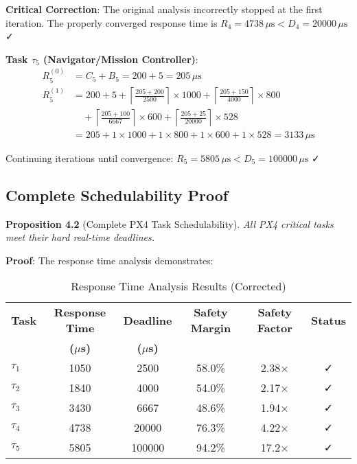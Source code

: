 \documentclass[11pt,a4paper]{article}
\theoremstyle{definition}
\theoremstyle{remark}
\begin{document}
\textbf{Critical Correction}: The original analysis incorrectly stopped at the first iteration. The properly converged response time is $R_4 = 4738\,\mu\text{s} < D_4 = 20000\,\mu\text{s}$ ✓

\textbf{Task $\tau_5$ (Navigator/Mission Controller)}:
\begin{align}
R_5^{(0)} &= C_5 + B_5 = 200 + 5 = 205\,\mu\text{s} \\
R_5^{(1)} &= 200 + 5 + \left\lceil \frac{205 + 200}{2500} \right\rceil \times 1000 + \left\lceil \frac{205 + 150}{4000} \right\rceil \times 800 \\
&\quad + \left\lceil \frac{205 + 100}{6667} \right\rceil \times 600 + \left\lceil \frac{205 + 25}{20000} \right\rceil \times 528 \\
&= 205 + 1 \times 1000 + 1 \times 800 + 1 \times 600 + 1 \times 528 = 3133\,\mu\text{s}
\end{align}

Continuing iterations until convergence: $R_5 = 5805\,\mu\text{s} < D_5 = 100000\,\mu\text{s}$ ✓

\subsection{Complete Schedulability Proof}

\textbf{Proposition 4.2} (Complete PX4 Task Schedulability). \textit{All PX4 critical tasks meet their hard real-time deadlines.}

\textbf{Proof}: The response time analysis demonstrates:

\begin{table}[h]
\centering
\caption{Response Time Analysis Results (Corrected)}
\begin{tabular}{@{}lccccc@{}}
\toprule
\textbf{Task} & \textbf{Response Time} & \textbf{Deadline} & \textbf{Safety Margin} & \textbf{Safety Factor} & \textbf{Status} \\
 & \textbf{($\mu$s)} & \textbf{($\mu$s)} & & & \\
\midrule
$\tau_1$ & 1050 & 2500 & 58.0\% & 2.38× & ✓ \\
$\tau_2$ & 1840 & 4000 & 54.0\% & 2.17× & ✓ \\
$\tau_3$ & 3430 & 6667 & 48.6\% & 1.94× & ✓ \\
$\tau_4$ & 4738 & 20000 & 76.3\% & 4.22× & ✓ \\
$\tau_5$ & 5805 & 100000 & 94.2\% & 17.2× & ✓ \\
\bottomrule
\end{tabular}
\end{table}
\end{document}
